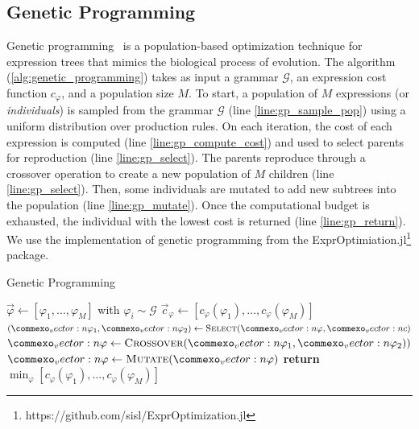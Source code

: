 \subsection{Genetic Programming}
\label{subsec:gp}
Genetic programming~\cite{kochenderfer2019algorithms, koza1992genetic} is a population-based optimization technique for expression trees that mimics the biological process of evolution. The algorithm (\cref{alg:genetic_programming}) takes as input a grammar $\mathcal{G}$, an expression cost function $c_\varphi$, and a population size $M$. To start, a population of $M$ expressions (or \emph{individuals}) is sampled from the grammar $\mathcal{G}$ (line \ref{line:gp_sample_pop}) using a uniform distribution over production rules. On each iteration, the cost of each expression is computed (line \ref{line:gp_compute_cost}) and used to select parents for reproduction (line \ref{line:gp_select}). The parents reproduce through a crossover operation to create a new population of $M$ children (line \ref{line:gp_select}). Then, some individuals are mutated to add new subtrees into the population (line \ref{line:gp_mutate}). Once the computational budget is exhausted, the individual with the lowest cost is returned (line \ref{line:gp_return}). We use the implementation of genetic programming from the ExprOptimiation.jl\footnote{https://github.com/sisl/ExprOptimization.jl} package.

\begin{algorithm}
\caption{Genetic Programming} \label{alg:genetic_programming}
\begin{algorithmic}[1]
    \State  $\vec{\varphi} \gets [\varphi_1, \ldots, \varphi_M]$ with  $\varphi_i \sim \mathcal{G}$ \label{line:gp_sample_pop}
    \Loop
        \State $\vec{c}_\varphi \gets [c_\varphi(\varphi_1), \ldots, c_\varphi(\varphi_M)]$ \label{line:gp_compute_cost}
        \State $(\vec{\varphi}_1, \vec{\varphi}_2) \gets \textproc{Select}(\vec{\varphi}, \vec{c})$ \label{line:gp_select}
        \State $\vec{\varphi} \gets \textproc{Crossover}(\vec{\varphi}_1, \vec{\varphi}_2))$ \label{line:gp_crossover}
        \State $\vec{\varphi} \gets \textproc{Mutate}(\vec{\varphi})$ \label{line:gp_mutate}
    \EndLoop
    \State \textbf{return} $\min_\varphi [c_\varphi(\varphi_1), \ldots, c_\varphi(\varphi_M)]$ \label{line:gp_return}
    \EndFunction
\end{algorithmic}
\end{algorithm}


